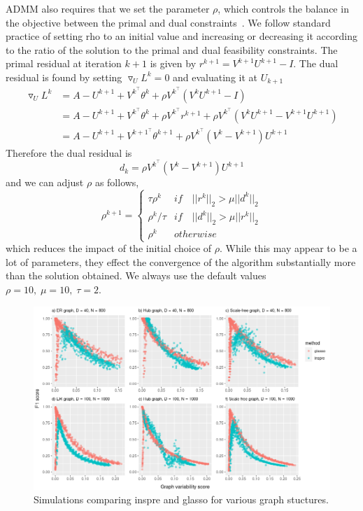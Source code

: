 \documentclass{article}
\begin{document}
ADMM also requires that we set the parameter $\rho$, which controls the
balance in the objective between the primal and dual constraints~\cite{Boyd2010}. We
follow standard practice of setting rho to an initial value and increasing
or decreasing it according to the ratio of the solution to the primal
and dual feasibility constraints. The primal residual at iteration $k+1$ is
given by $r^{k+1} = V^{k+1} U^{k+1} - I$. The dual residual is found by
setting $\triangledown_{U} L^k = 0$ and evaluating it at $U_{k+1}$
\begin{align*}
\triangledown_U L^{k} &= A - U^{k+1} + V^{k^\top} \theta^k + \rho V^{k^\top}(V^k U^{k+1}-I) \\
  &= A - U^{k+1} + V^{k^\top} \theta^k + \rho V^{k^\top}r^{k+1} + \rho V^{k^\top}(V^k U^{k+1}-V^{k+1} U^{k+1}) \\
  &= A - U^{k+1} + V^{k+1^\top} \theta^{k+1} + \rho V^{k^\top}(V^k - V^{k+1})U^{k+1}
\end{align*}
Therefore the dual residual is~\cite{Boyd2010}
\begin{equation*}
d_k = \rho V^{k^\top}(V^k - V^{k+1})U^{k+1}
\end{equation*}
and we can adjust $\rho$ as follows,
\begin{equation*}
\rho^{k+1} = \left\{ \begin{array}{ll}
  \tau \rho^k & if\quad ||r^k||_2 > \mu ||d^k||_2 \\
  \rho^k/\tau & if\quad ||d^k||_2 > \mu ||r^k||_2 \\
  \rho^k & otherwise \end{array} \right.
\end{equation*}
which reduces the impact of the initial choice of $\rho$. While this
may appear to be a lot of parameters, they effect the convergence of
the algorithm substantially more than the solution obtained.
We always use the default values $\rho = 10,\;\mu = 10,\;\tau = 2$.

\newpage
\begin{figure}[H]\label{figureS1}
\includegraphics[width=\textwidth]{figures/figure_S1.png}
\caption{Simulations comparing inspre and glasso for various graph stuctures.}
\end{figure}
\end{document}
